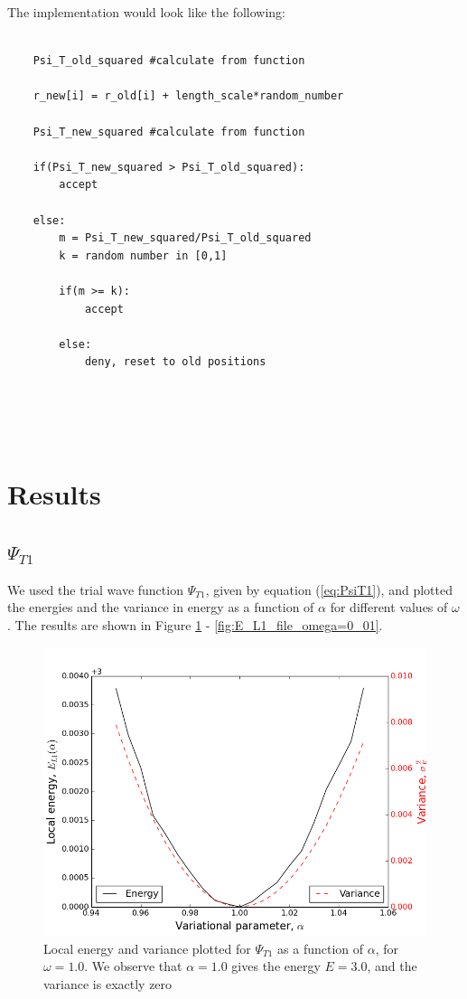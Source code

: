 \documentclass[norsk,a4paper,12pt]{article}
\begin{document}
\par 
\vspace{3mm}

The implementation would look like the following:

\begin{lstlisting}
    
    Psi_T_old_squared #calculate from function
    
    r_new[i] = r_old[i] + length_scale*random_number
    
    Psi_T_new_squared #calculate from function
    
    if(Psi_T_new_squared > Psi_T_old_squared):
        accept
    
    else:
        m = Psi_T_new_squared/Psi_T_old_squared
        k = random number in [0,1]
        
        if(m >= k):
            accept
            
        else:
            deny, reset to old positions
    
    
    
    
\end{lstlisting}

\section{Results} \label{Results}
\subsection{$\Psi_{T1}$}

We used the trial wave function $\Psi_{T1}$, given by equation (\ref{eq:PsiT1}), and plotted the energies and the variance in energy as a function of $\alpha$ for different values of $\omega$. The results are shown in Figure \ref{fig:E_L1_file_omega=1_0} - \ref{fig:E_L1_file_omega=0_01}.

\begin{figure} [H]
    \centering
    \includegraphics[scale=0.65]{E_L1_variance_omega=1_0}
    \caption{Local energy and variance plotted  for $\Psi_{T1}$ as a function of $\alpha$, for $\omega = 1.0$. We observe that $\alpha = 1.0$ gives the energy $E=3.0$, and the variance is exactly zero }
    \label{fig:E_L1_file_omega=1_0}
\end{figure} 
\end{document}
